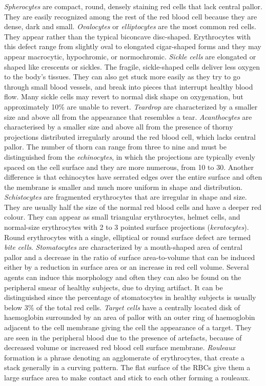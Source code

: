\documentclass[final,a4paper,12pt,english]{UnicaPhdThesis3}
\begin{document}
{\textit{Spherocytes} are compact, round, densely staining red cells that lack central pallor. They are easily recognized among the rest of the red blood cell because they are dense, dark and small. \textit{Ovalocytes} or \textit{elliptocytes} are the most common red cells. They appear rather than the typical biconcave disc-shaped. Erythrocytes with this defect range from slightly oval to elongated cigar-shaped forms and they may appear macrocytic, hypochromic, or normochromic.  \textit{Sickle cells} are elongated or shaped like crescents or sickles. The fragile, sickle-shaped cells deliver less oxygen to the body's tissues. They can also get stuck more easily as they try to go through small blood vessels, and break into pieces that interrupt healthy blood flow. Many sickle cells may revert to normal disk shape on oxygenation, but approximately 10\% are unable to revert.
\textit{Teardrop} are characterized by a smaller size and above all from the appearance that resembles a tear. \textit{Acanthocytes} are characterised by a smaller size and above all from the presence of thorny projections distributed irregularly around the red blood cell, which lacks central pallor. The number of thorn can range from three to nine and must be distinguished from the \textit{echinocytes}, in which the projections are typically evenly spaced on the cell surface and they are more numerous, from 10 to 30. Another difference is that echinocytes have serrated edges over the entire surface and often the membrane is smaller and much more uniform in shape and distribution. \textit{Schistocytes} are fragmented erythrocytes  that are irregular in shape and size. They are usually half the size of the normal red blood cells and have a deeper red colour. They can appear as small triangular erythrocytes, helmet cells, and normal-size erythrocytes with 2 to 3 pointed surface  projections (\textit{keratocytes}). Round erythrocytes with a single, elliptical or round surface defect are termed \textit{bite cells}. \textit{Stomatocytes} are characterized by a mouth-shaped area of central pallor and a decrease in the ratio of surface area-to-volume that can be induced either by a reduction in surface area or an increase in red cell volume. Several agents can induce this morphology and often they can also be found on the peripheral smear of healthy subjects, due to drying artifact. It can be distinguished since the percentage of stomatocytes in healthy subjects is usually below 3\% of the total red cells. \textit{Target cells} have a centrally located disk of haemoglobin surrounded by an area of pallor with an outer ring of haemoglobin adjacent to the cell membrane giving the cell the appearance of a target. They are seen in the peripheral blood due to the presence of artefacts, because of decreased volume or increased red blood cell surface membrane. \textit{Rouleaux} formation is a phrase denoting an agglomerate of erythrocytes, that create a stack generally in a curving pattern. The flat surface of the RBCs give them a large surface area to make contact and stick to each other forming a rouleaux. 

}
\end{document}
